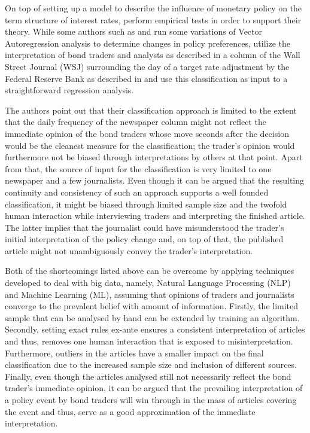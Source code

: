 On top of setting up a model to describe the influence of monetary policy on the term structure of interest rates, \textcite{Ellingsen.2001} perform empirical tests in order to support their theory. While some authors such as \textcite{Peersman.2002} and \textcite{Evans.1998} run some variations of Vector Autoregression analysis to determine changes in policy preferences, \textcite{Ellingsen.2001} utilize the interpretation of bond traders and analysts as described in a column of the Wall Street Journal (WSJ) surrounding the day of a target rate adjustment by the Federal Reserve Bank as described in \textcite{Ellingsen.2003} and use this classification as input to a straightforward regression analysis.

The authors point out that their classification approach is limited to the extent that the daily frequency of the newspaper column might not reflect the immediate opinion of the bond traders whose move seconds after the decision would be the cleanest measure for the classification; the trader's opinion would furthermore not be biased through interpretations by others at that point. Apart from that, the source of input for the classification is very limited to one newspaper and a few journalists. Even though it can be argued that the resulting continuity and consistency of such an approach supports a well founded classification, it might be biased through limited sample size and the twofold human interaction while interviewing traders and interpreting the finished article. The latter implies that the journalist could have misunderstood the trader's initial interpretation of the policy change and, on top of that, the published article might not unambiguously convey the trader's interpretation.

Both of the shortcomings listed above can be overcome by applying techniques developed to deal with big data, namely, Natural Language Processing (NLP) and Machine Learning (ML), assuming that opinions of traders and journalists converge to the prevalent belief with amount of information. Firstly, the limited sample that can be analysed by hand can be extended by training an algorithm. Secondly, setting exact rules ex-ante ensures a consistent interpretation of articles and thus, removes one human interaction that is exposed to misinterpretation. Furthermore, outliers in the articles have a smaller impact on the final classification due to the increased sample size and inclusion of different sources. Finally, even though the articles analysed still not necessarily reflect the bond trader's immediate opinion, it can be argued that the prevailing interpretation of a policy event by bond traders will win through in the mass of articles covering the event and thus, serve as a good approximation of the immediate interpretation. 

